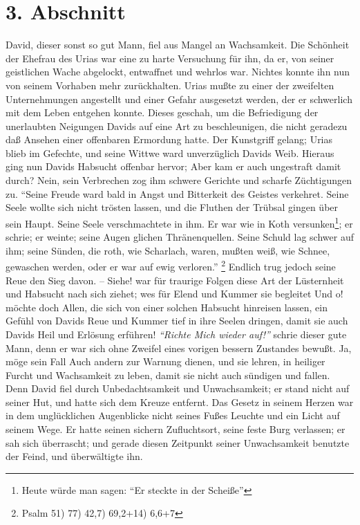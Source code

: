 \section{3. Abschnitt} \label{kap13_ab3} 

David, dieser sonst so gut Mann, fiel aus Mangel an Wachsamkeit. Die Schönheit
der Ehefrau des Urias war eine zu harte Versuchung für ihn, da er, von seiner
geistlichen Wache abgelockt, entwaffnet und wehrlos war. Nichtes konnte ihn nun
von seinem Vorhaben mehr zurückhalten. Urias mußte zu einer der zweifelten
Unternehmungen angestellt und einer Gefahr ausgesetzt werden, der er schwerlich
mit dem Leben entgehen konnte. Dieses geschah, um die Befriedigung der
unerlaubten Neigungen Davids auf eine Art zu beschleunigen, die nicht geradezu
daß Ansehen einer offenbaren Ermordung hatte. Der Kunstgriff gelang; Urias blieb
im Gefechte, und seine Wittwe ward unverzüglich Davids Weib. Hieraus ging nun
Davids Habsucht offenbar hervor; Aber kam er auch ungestraft damit durch? Nein,
sein Verbrechen zog ihm schwere Gerichte und scharfe Züchtigungen zu.
"`Seine
Freude ward bald in Angst und Bitterkeit des Geistes verkehret. Seine Seele
wollte sich nicht trösten lassen, und die Fluthen der Trübsal gingen über sein
Haupt. Seine Seele verschmachtete in ihm. Er war wie in Koth versunken\footnote{Heute würde man sagen: "`Er steckte in der Scheiße"'}; er schrie; er weinte;
seine Augen glichen Thränenquellen. Seine Schuld lag schwer auf ihm; seine
Sünden, die roth, wie Scharlach, waren, mußten weiß, wie Schnee, gewaschen
werden, oder er war auf ewig verloren."'
\footnote{Psalm 51) 77) 42,7) 69,2+14) 6,6+7}
Endlich trug jedoch seine Reue den Sieg davon. -- Siehe! war für
traurige Folgen diese Art der Lüsternheit und Habsucht nach sich ziehet; wes für
Elend und Kummer sie begleitet Und o! möchte doch Allen, die sich von einer
solchen Habsucht hinreisen lassen, ein Gefühl von Davids Reue und Kummer tief in
ihre Seelen dringen, damit sie auch Davids Heil und Erlösung erführen! \textit{"`Richte
Mich wieder auf!"'} schrie dieser gute Mann, denn er war sich ohne Zweifel eines
vorigen bessern Zustandes bewußt. Ja, möge sein Fall Auch andern zur Warnung
dienen, und sie lehren, in heiliger Furcht und Wachsamkeit zu leben, damit sie
nicht auch sündigen und fallen. Denn David fiel durch Unbedachtsamkeit und
Unwachsamkeit; er stand nicht auf seiner Hut, und hatte sich dem Kreuze
entfernt. Das Gesetz in seinem Herzen war in dem unglücklichen Augenblicke nicht
seines Fußes Leuchte und ein Licht auf seinem Wege. Er hatte seinen sichern
Zufluchtsort, seine feste Burg verlassen; er sah sich überrascht; und gerade
diesen Zeitpunkt seiner Unwachsamkeit benutzte der Feind, und überwältigte ihn.

